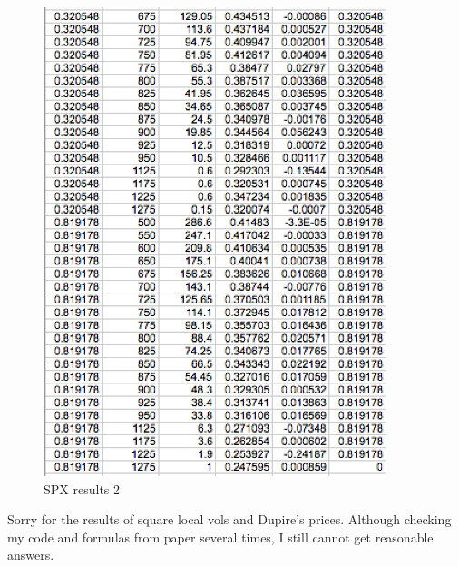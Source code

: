 \documentclass{article}
\begin{document}
\begin{figure}[h] 
\begin{center} 
\includegraphics[width = 10cm]{S2.png}  
\caption{SPX results 2} 
\end{center} 
\end{figure}

Sorry for the results of square local vols and Dupire's prices. Although checking my code and formulas from paper several times, I still cannot get reasonable answers. 
\end{document}
